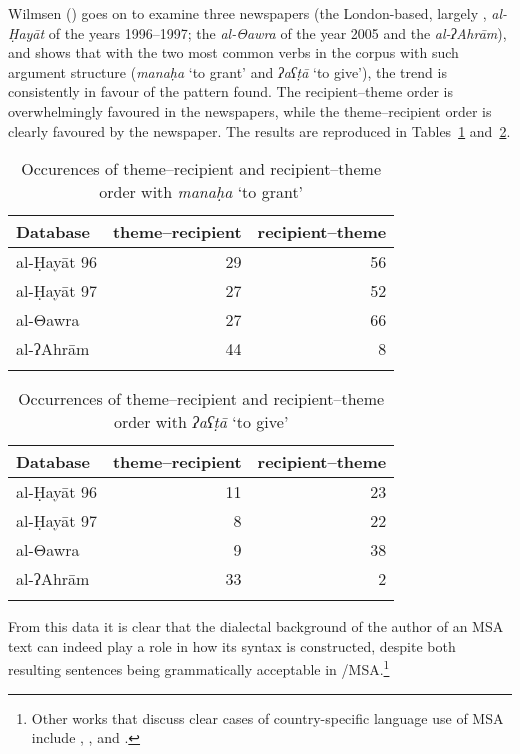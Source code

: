 \documentclass[output=paper]{langsci/langscibook}
\begin{document}
Wilmsen (\citeyear[114--115]{Wilmsen2010}) goes on to examine three newspapers (the London-based, largely , \textit{al-Ḥayāt} of the years 1996--1997; the  \textit{al-Θawra} of the year 2005 and the  \textit{al-ʔAhrām}), and shows that with the two most common verbs in the corpus with such argument structure (\textit{manaḥa} ‘to grant’ and \textit{ʔaʕṭā} ‘to give’), the trend is consistently in favour of the pattern found. The recipient–theme order is overwhelmingly favoured in the  newspapers, while the theme–recipient order is clearly favoured by the  newspaper. The results are reproduced in Tables~\ref{tab:vanputten:1} and~\ref{tab:vanputten:2}.


\begin{table}
\begin{tabular}{lrr}
\lsptoprule
{Database} & {theme–recipient} & {recipient–theme}\\\midrule
al-Ḥayāt 96 & 29 & 56\\
al-Ḥayāt 97 & 27 & 52\\
al-Θawra & 27 & 66\\
al-ʔAhrām & 44 & \hphantom{1}8\\
\lspbottomrule
\end{tabular}
\caption{\label{bkm:Ref533762442}\label{tab:vanputten:1}Occurences of theme–recipient and recipient–theme order with \textit{manaḥa} ‘to grant’}
\end{table}

\begin{table}
\begin{tabular}{lrr}
\lsptoprule
{Database} & {theme–recipient} & {recipient–theme}\\\midrule
al-Ḥayāt 96 & 11 & 23\\
al-Ḥayāt 97 & \hphantom{1}8 & 22\\
al-Θawra    &  \hphantom{1}9 & 38\\
al-ʔAhrām   & 33 &  \hphantom{1}2\\
\lspbottomrule
\end{tabular}
\caption{\label{bkm:Ref533762457}\label{tab:vanputten:2}Occurrences of theme–recipient and recipient–theme order with \textit{ʔaʕṭā} ‘to give’}
\end{table}

From this data it is clear that the dialectal background of the author of an MSA text can indeed play a role in how its syntax is constructed, despite both resulting sentences being grammatically acceptable in /MSA.\footnote{Other works that discuss clear cases of country-specific language use of MSA include \citet{Ibrahim2009}, \citet{Parkinson2003},  \citet{Parkinson2007} and \citet{ParkinsonIbrahim1999}.}
\end{document}
